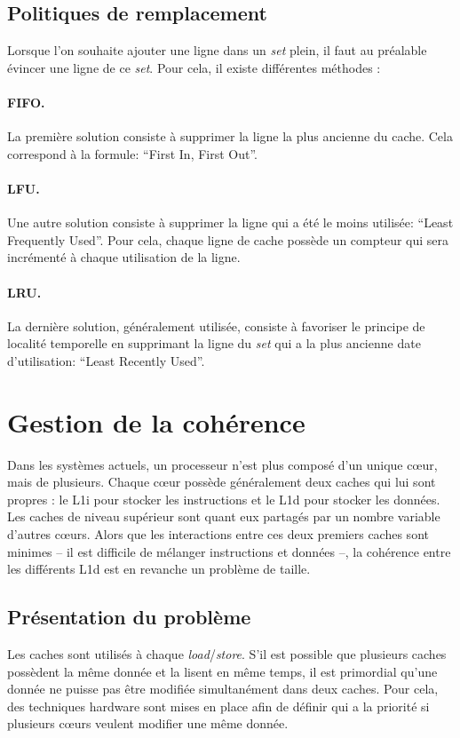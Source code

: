 
\subsection{Politiques de remplacement}
\label{remplacement}
 Lorsque l'on souhaite ajouter une ligne dans un \textit{set} plein, il faut au préalable évincer une ligne de ce \textit{set}. Pour cela, il existe différentes méthodes :

\paragraph{FIFO.} La première solution consiste à supprimer la ligne la plus ancienne du cache. Cela correspond à la formule: ``First In, First Out''.

\paragraph{LFU.} Une autre solution consiste à supprimer la ligne qui a été le moins utilisée: ``Least Frequently Used''. Pour cela, chaque ligne de cache possède un compteur qui sera incrémenté à chaque utilisation de la ligne. 

\paragraph{LRU.} La dernière solution, généralement utilisée, consiste à favoriser le principe de localité temporelle en supprimant la ligne du \textit{set} qui a la plus ancienne date d'utilisation: ``Least Recently Used''.

\section{Gestion de la cohérence}
Dans les systèmes actuels, un processeur n'est plus composé d'un unique c{\oe}ur, mais de plusieurs. Chaque c{\oe}ur possède généralement deux caches qui lui sont propres : le L1i pour stocker les instructions et le L1d pour stocker les données. Les caches de niveau supérieur sont quant  eux partagés par un nombre variable d'autres c{\oe}urs. Alors que les interactions entre ces deux premiers caches sont minimes -- il est difficile de mélanger instructions et données --, la cohérence entre les différents L1d est en revanche un problème de taille.

\subsection{Présentation du problème}
Les caches sont utilisés à chaque \textit{load}/\textit{store}. S'il est possible que plusieurs caches possèdent la même donnée et la lisent en même temps, il est primordial qu'une donnée ne puisse pas être modifiée simultanément dans deux caches. Pour cela, des techniques hardware sont mises en place afin de définir qui a la priorité si plusieurs c{\oe}urs veulent modifier une même donnée. \\

